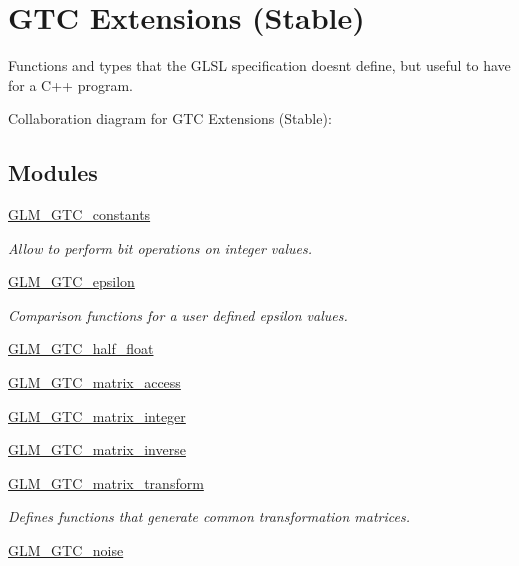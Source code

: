\hypertarget{group__gtc}{}\section{G\+T\+C Extensions (Stable)}
\label{group__gtc}


Functions and types that the G\+L\+S\+L specification doesn\textquotesingle{}t define, but useful to have for a C++ program.  


Collaboration diagram for G\+T\+C Extensions (Stable)\+:
\subsection*{Modules}
\begin{DoxyCompactItemize}
\item 
\hyperlink{group__gtc__constants}{G\+L\+M\+\_\+\+G\+T\+C\+\_\+constants}
\begin{DoxyCompactList}\small\item\em Allow to perform bit operations on integer values. \end{DoxyCompactList}\item 
\hyperlink{group__gtc__epsilon}{G\+L\+M\+\_\+\+G\+T\+C\+\_\+epsilon}
\begin{DoxyCompactList}\small\item\em Comparison functions for a user defined epsilon values. \end{DoxyCompactList}\item 
\hyperlink{group__gtc__half__float}{G\+L\+M\+\_\+\+G\+T\+C\+\_\+half\+\_\+float}
\item 
\hyperlink{group__gtc__matrix__access}{G\+L\+M\+\_\+\+G\+T\+C\+\_\+matrix\+\_\+access}
\item 
\hyperlink{group__gtc__matrix__integer}{G\+L\+M\+\_\+\+G\+T\+C\+\_\+matrix\+\_\+integer}
\item 
\hyperlink{group__gtc__matrix__inverse}{G\+L\+M\+\_\+\+G\+T\+C\+\_\+matrix\+\_\+inverse}
\item 
\hyperlink{group__gtc__matrix__transform}{G\+L\+M\+\_\+\+G\+T\+C\+\_\+matrix\+\_\+transform}
\begin{DoxyCompactList}\small\item\em Defines functions that generate common transformation matrices. \end{DoxyCompactList}\item 
\hyperlink{group__gtc__noise}{G\+L\+M\+\_\+\+G\+T\+C\+\_\+noise}
\item 

\end{DoxyCompactItemize}
